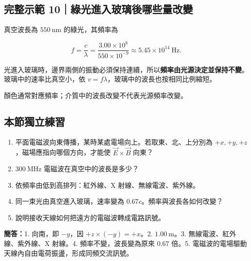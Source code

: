 \documentclass[11pt,a4paper]{article}
\providecommand{\tightlist}{%
  \setlength{\itemsep}{0pt}\setlength{\parskip}{0pt}}
\begin{document}
\begin{HandoutWorkedExample}

\subsection{完整示範 10｜綠光進入玻璃後哪些量改變}\label{ux5b8cux6574ux793aux7bc4-10ux7da0ux5149ux9032ux5165ux73bbux7483ux5f8cux54eaux4e9bux91cfux6539ux8b8a}

真空波長為 \(550\ \mathrm{nm}\) 的綠光，其頻率為

\[
f=\frac{c}{\lambda}
=\frac{3.00\times10^8}{550\times10^{-9}}
\approx5.45\times10^{14}\ \mathrm{Hz}.
\]

光進入玻璃時，邊界兩側的振動必須保持連續，所以\textbf{頻率由光源決定並保持不變}。玻璃中的速率比真空小，依 \(v=f\lambda\)，玻璃中的波長也按相同比例縮短。

顏色通常對應頻率；介質中的波長改變不代表光源頻率改變。

\end{HandoutWorkedExample}

\begin{HandoutSelfCheck}

\subsection{本節獨立練習}\label{ux672cux7bc0ux7368ux7acbux7df4ux7fd2-2}

\begin{enumerate}
\def\labelenumi{\arabic{enumi}.}
\tightlist
\item
  平面電磁波向東傳播，某時某處電場向上。若取東、北、上分別為 \(+x,+y,+z\)，磁場應指向哪個方向，才能使 \(\vec E\times\vec B\) 向東？
\item
  \(300\ \mathrm{MHz}\) 電磁波在真空中的波長是多少？
\item
  依頻率由低到高排列：紅外線、X 射線、無線電波、紫外線。
\item
  同一束光由真空進入玻璃，速率變為 \(0.67c\)。頻率與波長各如何改變？
\item
  說明接收天線如何把遠方的電磁波轉成電路訊號。
\end{enumerate}

\textbf{簡答：}1. 向南，即 \(-y\)，因 \(+z\times(-y)=+x\)。2. \(1.00\ \mathrm m\)。3. 無線電波、紅外線、紫外線、X 射線。4. 頻率不變，波長變為原來 \(0.67\) 倍。5. 電磁波的電場驅動天線內自由電荷振盪，形成同頻交流訊號。

\end{HandoutSelfCheck}
\end{document}
